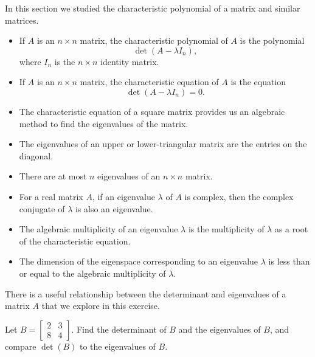 \begin{example}
\end{example}

In this section we studied the characteristic polynomial of a matrix and similar matrices.
\begin{itemize}
\item If $A$ is an $n \times n$ matrix, the characteristic polynomial of $A$ is the polynomial
\[\det(A-\lambda I_n),\]
where $I_n$ is the $n \times n$ identity matrix.
\item If $A$ is an $n \times n$ matrix, the characteristic equation of $A$ is the equation
\[\det(A-\lambda I_n) = 0.\]
\item The characteristic equation of a square matrix provides us an algebraic method to find the eigenvalues of the matrix.
\item The eigenvalues of an upper or lower-triangular matrix are the entries on the diagonal.
\item There are at most $n$ eigenvalues of an $n\times n$ matrix.
\item For a real matrix $A$, if an eigenvalue $\lambda$ of $A$ is complex, then the complex conjugate of $\lambda$ is also an eigenvalue.
\item The algebraic multiplicity of an eigenvalue $\lambda$ is the multiplicity of $\lambda$ as a root of the characteristic equation.
\item The dimension of the eigenspace corresponding to an eigenvalue $\lambda$ is less than or equal to the algebraic multiplicity of $\lambda$.

\end{itemize}





\be
	
\item \label{ex:determinant_eigenvalues} There is a useful relationship between the determinant and eigenvalues of a matrix $A$ that we explore in this exercise. 
	\ba
	\item Let $B = \left[ \begin{array}{cc} 2&3\\8&4 \end{array} \right]$. Find the determinant of $B$ and the eigenvalues of $B$, and compare $\det(B)$ to the eigenvalues of $B$.
	
